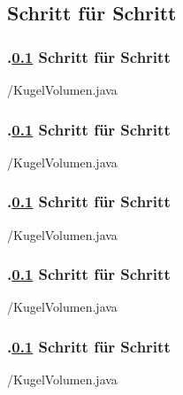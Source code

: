 \def\stitle{Schritt f\"ur Schritt}%
\subsection{\stitle}\label{S:SchrittSchritt}
\begin{frame}[t]%
  \frametitle{\kap.\ref{S:SchrittSchritt} \stitle}%
\medskip


{\getexercisefolder/KugelVolumen.java}

\end{frame}


\def\stitle{Schritt f\"ur Schritt}%
\begin{frame}[t]%
  \frametitle{\kap.\ref{S:SchrittSchritt} \stitle}%
\medskip


{\getexercisefolder/KugelVolumen.java}

\end{frame}


\def\stitle{Schritt f\"ur Schritt}%
\begin{frame}[t]%
  \frametitle{\kap.\ref{S:SchrittSchritt} \stitle}%
\medskip


{\getexercisefolder/KugelVolumen.java}

\end{frame}


\def\stitle{Schritt f\"ur Schritt}%
\begin{frame}[t]%
  \frametitle{\kap.\ref{S:SchrittSchritt} \stitle}%
\medskip


{\getexercisefolder/KugelVolumen.java}

\end{frame}


\def\stitle{Schritt f\"ur Schritt}%
\begin{frame}[t]%
  \frametitle{\kap.\ref{S:SchrittSchritt} \stitle}%
\medskip


{\getexercisefolder/KugelVolumen.java}

\end{frame}



